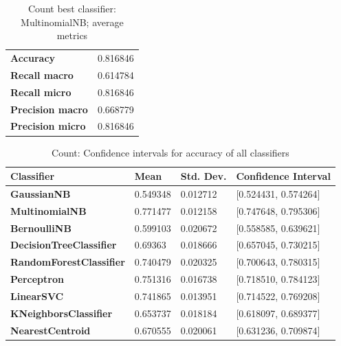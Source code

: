 \documentclass{article}
\begin{document}
\begin{table}[H]
\begin{tabular}{l|l}
\textbf{Accuracy}        & 0.816846 \\
\textbf{Recall macro}    & 0.614784 \\
\textbf{Recall micro}    & 0.816846 \\
\textbf{Precision macro} & 0.668779 \\
\textbf{Precision micro} & 0.816846
\end{tabular}
\caption {Count best classifier: MultinomialNB; average metrics}
\end{table}

\begin{table}[H]
\begin{tabular}{l|lll}
\textbf{Classifier}             & \textbf{Mean} & \textbf{Std. Dev.} & \textbf{Confidence Interval} \\ \hline
\textbf{GaussianNB}             & 0.549348      & 0.012712                    & {[}0.524431, 0.574264{]}     \\
\textbf{MultinomialNB}          & 0.771477      & 0.012158                    & {[}0.747648, 0.795306{]}     \\
\textbf{BernoulliNB}            & 0.599103      & 0.020672                    & {[}0.558585, 0.639621{]}     \\
\textbf{DecisionTreeClassifier} & 0.69363       & 0.018666                    & {[}0.657045, 0.730215{]}     \\
\textbf{RandomForestClassifier} & 0.740479      & 0.020325                    & {[}0.700643, 0.780315{]}     \\
\textbf{Perceptron}             & 0.751316      & 0.016738                    & {[}0.718510, 0.784123{]}     \\
\textbf{LinearSVC}              & 0.741865      & 0.013951                    & {[}0.714522, 0.769208{]}     \\
\textbf{KNeighborsClassifier}   & 0.653737      & 0.018184                    & {[}0.618097, 0.689377{]}     \\
\textbf{NearestCentroid}        & 0.670555      & 0.020061                    & {[}0.631236, 0.709874{]}    
\end{tabular}
\caption {Count: Confidence intervals for accuracy of all classifiers}
\end{table}

\clearpage
\end{document}
